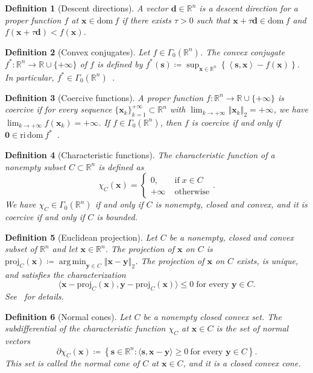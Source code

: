 \documentclass[11pt]{article}
\numberwithin{prop}{section}
\numberwithin{lem}{section}
\numberwithin{rem}{section}
\numberwithin{cor}{section}
\numberwithin{thm}{section}
\newtheorem{defn}{Definition}
\numberwithin{defn}{section}
\numberwithin{fact}{section}
\theoremstyle{plain}
\def\bd {\boldsymbol{d}}
\def\bs {\boldsymbol{s}}
\def\bx {\boldsymbol{x}}
\def\by {\boldsymbol{y}}
\def\R {\mathbb{R}}
\newcommand{\normtwo}[1]{\left\Vert{#1} \right\Vert_{2}}
\def\dom {\mathrm{dom~}}    %
\def\ri {\mathrm{ri}}      %
\def\proj {\mathrm{proj}}
\def\Rn {\R^n}
\def\gmRn {\Gamma_0(\Rn)}   %
\DeclareMathOperator*{\argmin}{arg\,min}
\begin{document}
%
\begin{defn}[Descent directions]\label{def:descent_dir}
A vector $\bd \in \Rn$ is a descent direction for a proper function $f$ at $\bx \in \dom f$ if there exists $\tau > 0$ such that $\bx + \tau\bd \in \dom f$ and $f(\bx + \tau\bd) < f(\bx)$.
\end{defn}
%
\begin{defn}[Convex conjugates] \label{def:conv_conj}
Let $f \in \gmRn$. The convex conjugate $f^{*}\colon\Rn\to\mathbb{R}\cup\{+\infty\}$ of $f$ is defined by $f^{*}(\bs)\coloneqq\sup_{\bx \in \Rn}\left\{\left\langle \bs,\bx\right\rangle -f(\bx)\right\}$. In particular, $f^* \in \gmRn$~\cite[Definition 4.1]{ekeland1999convex}.
\end{defn}
%
\begin{defn}[Coercive functions]\label{def:coercive}
A proper function $f\colon\Rn\to\R\cup\{+\infty\}$ is coercive if for every sequence $\{\bx_k\}_{k=1}^{+\infty} \subset \Rn$ with $\lim_{k \to +\infty} \normtwo{\bx_k} = +\infty$, we have $\lim_{k \to +\infty} f(\bx_k) = +\infty$. If $f \in \gmRn$, then $f$ is coercive if and only if $\boldsymbol{0} \in \ri \, \dom f^{*}$~\cite[Theorem 11.8, page 479]{rockafellar2009variational}.
\end{defn}
%
\begin{defn}[Characteristic functions]\label{def:char_fun}
The characteristic function of a nonempty subset $C \subset \Rn$ is defined as
\[
\chi_{C}(\bx) = \begin{cases} 0, \; &\text{if}\;x \in C \\ +\infty \; &\text{otherwise}\end{cases}.
\]
We have $\chi_{C} \in \gmRn$ if and only if $C$ is nonempty, closed and convex, and it is coercive if and only if $C$ is bounded.
\end{defn}
%
\begin{defn}[Euclidean projection]\label{def:projection}
Let $C$ be a nonempty, closed and convex subset of $\Rn$ and let $\bx \in \Rn$. The projection of $\bx$ on $C$ is $\proj_{C}(\bx) \coloneqq \argmin_{\by \in C} \normtwo{\bx-\by}$. The projection of $\bx$ on $C$ exists, is unique, and satisfies the characterization
\begin{equation}\label{eq:char_projections}
\langle \bx - \proj_{C}(\bx), \by - \proj_{C}(\bx) \rangle \leqslant 0 \; \text{for every } \by \in C.
\end{equation}
See~\cite[Section III, 3.1]{hiriart2013convexI} for details.
\end{defn}
%
\begin{defn}[Normal cones]\label{def:normal_cones}
    Let $C$ be a nonempty closed convex set. The subdifferential of the characteristic function $\chi_{C}$ at $\bx \in C$ is the set of normal vectors
    \[
    \partial\chi_{C}(\bx) \coloneqq \left\{\bs \in \Rn : \langle\bs,\bx-\by\rangle \geqslant 0 \ \text{for every $\by \in C$} \right\}.
    \]
    This set is called the normal cone of $C$ at $\bx \in C$, and it is a closed convex cone.
\end{defn}
\end{document}
